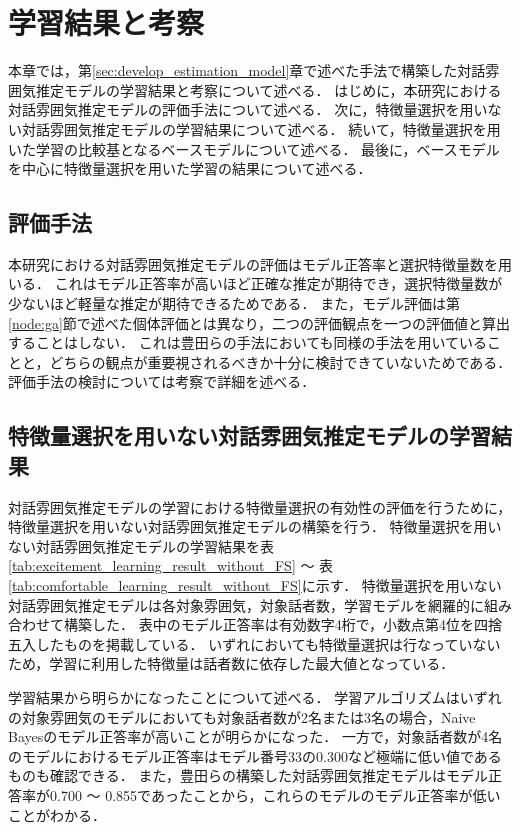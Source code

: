 \chapter{学習結果と考察\label{sec:evaluate_estimation_model}}
\thispagestyle{plain}

本章では，第\ref{sec:develop_estimation_model}章で述べた手法で構築した対話雰囲気推定モデルの学習結果と考察について述べる．
はじめに，本研究における対話雰囲気推定モデルの評価手法について述べる．
次に，特徴量選択を用いない対話雰囲気推定モデルの学習結果について述べる．
続いて，特徴量選択を用いた学習の比較基となるベースモデルについて述べる．
最後に，ベースモデルを中心に特徴量選択を用いた学習の結果について述べる．

\section{評価手法}

本研究における対話雰囲気推定モデルの評価はモデル正答率と選択特徴量数を用いる．
これはモデル正答率が高いほど正確な推定が期待でき，選択特徴量数が少ないほど軽量な推定が期待できるためである．
また，モデル評価は第\ref{node:ga}節で述べた個体評価とは異なり，二つの評価観点を一つの評価値と算出することはしない．
これは豊田らの手法においても同様の手法を用いていることと，どちらの観点が重要視されるべきか十分に検討できていないためである．
評価手法の検討については考察で詳細を述べる．

\section{特徴量選択を用いない対話雰囲気推定モデルの学習結果\label{node:learning_result_without_ga}}

対話雰囲気推定モデルの学習における特徴量選択の有効性の評価を行うために，特徴量選択を用いない対話雰囲気推定モデルの構築を行う．
特徴量選択を用いない対話雰囲気推定モデルの学習結果を表\ref{tab:excitement_learning_result_without_FS} 〜 表\ref{tab:comfortable_learning_result_without_FS}に示す．
特徴量選択を用いない対話雰囲気推定モデルは各対象雰囲気，対象話者数，学習モデルを網羅的に組み合わせて構築した．
表中のモデル正答率は有効数字4桁で，小数点第4位を四捨五入したものを掲載している．
いずれにおいても特徴量選択は行なっていないため，学習に利用した特徴量は話者数に依存した最大値となっている．

学習結果から明らかになったことについて述べる．
学習アルゴリズムはいずれの対象雰囲気のモデルにおいても対象話者数が2名または3名の場合，Naive Bayesのモデル正答率が高いことが明らかになった．
一方で，対象話者数が4名のモデルにおけるモデル正答率はモデル番号33の0.300など極端に低い値であるものも確認できる．
また，豊田らの構築した対話雰囲気推定モデルはモデル正答率が0.700 〜 0.855であったことから，これらのモデルのモデル正答率が低いことがわかる．

